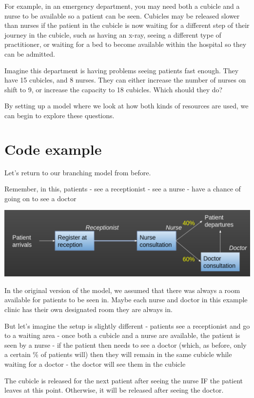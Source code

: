 \documentclass[
  letterpaper,
  DIV=11,
  numbers=noendperiod]{scrreprt}
\begin{document}
For example, in an emergency department, you may need both a cubicle and
a nurse to be available so a patient can be seen. Cubicles may be
released slower than nurses if the patient in the cubicle is now waiting
for a different step of their journey in the cubicle, such as having an
x-ray, seeing a different type of practitioner, or waiting for a bed to
become available within the hospital so they can be admitted.

Imagine this department is having problems seeing patients fast enough.
They have 15 cubicles, and 8 nurses. They can either increase the number
of nurses on shift to 9, or increase the capacity to 18 cubicles. Which
should they do?

By setting up a model where we look at how both kinds of resources are
used, we can begin to explore these questions.

\section{Code example}\label{code-example}

Let's return to our branching model from before.

Remember, in this, patients - see a receptionist - see a nurse - have a
chance of going on to see a doctor

\includegraphics{images/example_simple_model_branching.png}

In the original version of the model, we assumed that there was always a
room available for patients to be seen in. Maybe each nurse and doctor
in this example clinic has their own designated room they are always in.

But let's imagine the setup is slightly different - patients see a
receptionist and go to a waiting area - once both a cubicle and a nurse
are available, the patient is seen by a nurse - if the patient then
needs to see a doctor (which, as before, only a certain \% of patients
will) then they will remain in the same cubicle while waiting for a
doctor - the doctor will see them in the cubicle

The cubicle is released for the next patient after seeing the nurse IF
the patient leaves at this point. Otherwise, it will be released after
seeing the doctor.
\end{document}
